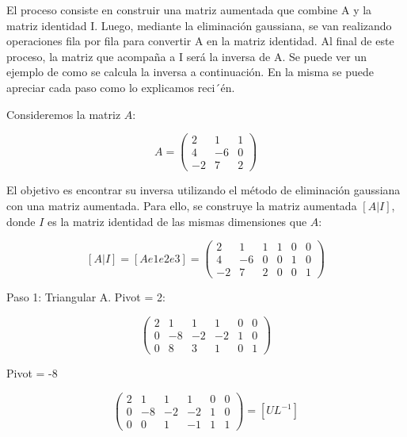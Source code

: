 El proceso consiste en construir una matriz aumentada que combine A y la matriz identidad I. Luego, mediante la eliminación gaussiana, se van realizando operaciones fila por fila para convertir A en la matriz identidad. Al final de este proceso, la matriz que acompaña a I será la inversa de A. Se puede ver un ejemplo de como se calcula la inversa a continuación. En la misma se puede apreciar cada paso como lo explicamos reci´én.



Consideremos la matriz \( A \):

\[
A = \begin{pmatrix}
2 & 1 & 1 \\
4 & -6 & 0 \\
-2 & 7 & 2
\end{pmatrix}
\]

El objetivo es encontrar su inversa utilizando el método de eliminación gaussiana con una matriz aumentada. Para ello, se construye la matriz aumentada \( [A | I] \), donde \( I \) es la matriz identidad de las mismas dimensiones que \( A \):

\[
[A | I] = [A  e1  e2  e3] = \begin{pmatrix}
2 & 1 & 1 & 1 & 0 & 0 \\
4 & -6 & 0 & 0 & 1 & 0 \\
-2 & 7 & 2 & 0 & 0 & 1
\end{pmatrix} 
\]\label{fig:aumentada}


Paso 1: Triangular A. Pivot = 2:

\[
\begin{pmatrix}
2 & 1 & 1 & 1 & 0 & 0 \\
0 & -8 & -2 & -2 & 1 & 0 \\
0 & 8 & 3 & 1 & 0 & 1
\end{pmatrix}
\]


 Pivot = -8
 
\[
\begin{pmatrix}
2 & 1 & 1 & 1 & 0 & 0 \\
0 & -8 & -2 & -2 & 1 & 0 \\
0 & 0 & 1 & -1 & 1 & 1
\end{pmatrix} = [U L^{-1}] 
\]


